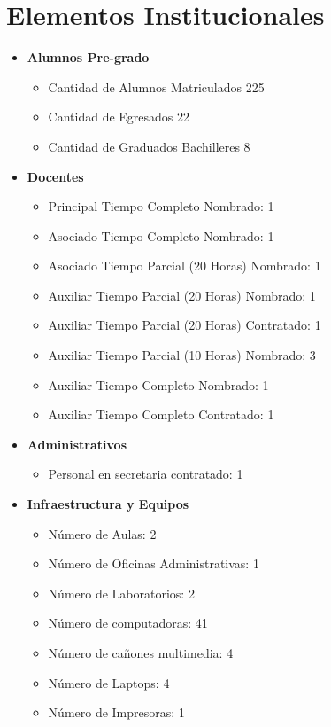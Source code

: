 \section{Elementos Institucionales}

\begin{itemize}
 
\item \textbf{Alumnos Pre-grado}
\begin{itemize}
\item Cantidad de Alumnos Matriculados 225
\item Cantidad de Egresados 22
\item Cantidad de Graduados Bachilleres 8
\end{itemize} 

\item \textbf{Docentes}
\begin{itemize}
\item Principal Tiempo Completo Nombrado: 1
\item Asociado Tiempo Completo Nombrado: 1
\item Asociado Tiempo Parcial (20 Horas) Nombrado: 1
\item Auxiliar Tiempo Parcial (20 Horas) Nombrado: 1
\item Auxiliar Tiempo Parcial (20 Horas) Contratado: 1
\item Auxiliar Tiempo Parcial (10 Horas) Nombrado: 3
\item Auxiliar Tiempo Completo Nombrado: 1
\item Auxiliar Tiempo Completo Contratado: 1
\end{itemize} 

\item \textbf{Administrativos}
\begin{itemize}
\item Personal en secretaria contratado: 1
\end{itemize}

\item \textbf{Infraestructura y Equipos}
\begin{itemize}
\item Número de Aulas: 2
\item Número de Oficinas Administrativas: 1
\item Número de Laboratorios: 2
\item Número de computadoras: 41
\item Número de cañones multimedia: 4 
\item Número de Laptops: 4
\item Número de Impresoras: 1
\end{itemize}

\end{itemize}

